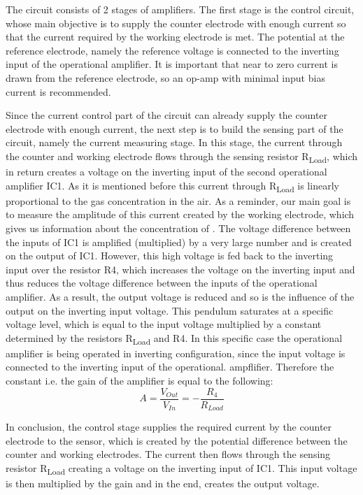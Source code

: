 The circuit consists of 2 stages of amplifiers. The first stage is the control circuit, whose main objective is to supply the counter electrode with enough current so that the current required by the working electrode is met. The potential at the reference electrode, namely the reference voltage is connected to the inverting input of the operational amplifier. It is important that near to zero current is drawn from the reference electrode, so an op-amp with minimal input bias current is recommended. \cite{2009} \par 
Since the current control part of the circuit can already supply the counter electrode with enough current, the next step is to build the sensing part of the circuit, namely the current measuring stage. In this stage, the current through the counter and working electrode flows through the sensing resistor R\textsubscript{Load}, which in return creates a voltage on the inverting input of the second operational amplifier IC1. As it is mentioned before this current through R\textsubscript{Load} is linearly proportional to the gas concentration in the air. As a reminder, our main goal is to measure the amplitude of this current created by the working electrode, which gives us information about the concentration of . The voltage difference between the inputs of IC1 is amplified (multiplied) by a very large number and is created on the output of IC1. However, this high voltage is fed back to the inverting input over the resistor R4, which increases the voltage on the inverting input and thus reduces the voltage difference between the inputs of the operational amplifier. As a result, the output voltage is reduced and so is the influence of the output on the inverting input voltage. This pendulum saturates at a specific voltage level, which is equal to the input voltage multiplied by a constant determined by the resistors R\textsubscript{Load} and R4. In this specific case the operational amplifier is being operated in inverting configuration, since the input voltage is connected to the inverting input of the operational. ampflifier. Therefore the constant i.e. the gain of the amplifier is equal to the following: \[A = \frac{V_{Out}}{V_{In}} = -\frac{R_4}{R_{Load}} \] \par
In conclusion, the control stage supplies the required current by the counter electrode to the sensor, which is created by the potential difference between the counter and working electrodes. The current then flows through the sensing resistor  R\textsubscript{Load} creating a voltage on the inverting input of IC1. This input voltage is then multiplied by the gain and in the end, creates the output voltage.

